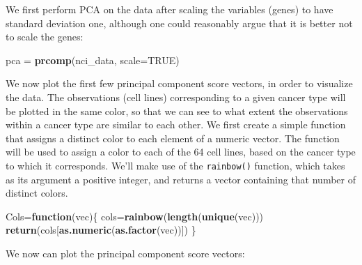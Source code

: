 \documentclass[openany]{book}
\newenvironment{Shaded}{\begin{snugshade}}{\end{snugshade}}
\newcommand{\ControlFlowTok}[1]{\textcolor[rgb]{0.13,0.29,0.53}{\textbf{#1}}}
\newcommand{\DataTypeTok}[1]{\textcolor[rgb]{0.13,0.29,0.53}{#1}}
\newcommand{\DecValTok}[1]{\textcolor[rgb]{0.00,0.00,0.81}{#1}}
\newcommand{\KeywordTok}[1]{\textcolor[rgb]{0.13,0.29,0.53}{\textbf{#1}}}
\newcommand{\NormalTok}[1]{#1}
\newcommand{\OperatorTok}[1]{\textcolor[rgb]{0.81,0.36,0.00}{\textbf{#1}}}
\newcommand{\OtherTok}[1]{\textcolor[rgb]{0.56,0.35,0.01}{#1}}
\newcommand{\StringTok}[1]{\textcolor[rgb]{0.31,0.60,0.02}{#1}}
\begin{document}
We first perform PCA on the data after scaling the variables (genes) to
have standard deviation one, although one could reasonably argue that it
is better not to scale the genes:

\begin{Shaded}
\begin{Highlighting}[]
\NormalTok{pca =}\StringTok{ }\KeywordTok{prcomp}\NormalTok{(nci_data, }\DataTypeTok{scale=}\OtherTok{TRUE}\NormalTok{)}
\end{Highlighting}
\end{Shaded}

We now plot the first few principal component score vectors, in order to
visualize the data. The observations (cell lines) corresponding to a given
cancer type will be plotted in the same color, so that we can see to what
extent the observations within a cancer type are similar to each other. We
first create a simple function that assigns a distinct color to each element
of a numeric vector. The function will be used to assign a color to each of
the 64 cell lines, based on the cancer type to which it corresponds.
We'll make use of the \texttt{rainbow()} function, which takes as its argument a positive integer,
and returns a vector containing that number of distinct colors.

\begin{Shaded}
\begin{Highlighting}[]
\NormalTok{Cols=}\ControlFlowTok{function}\NormalTok{(vec)\{}
\NormalTok{    cols=}\KeywordTok{rainbow}\NormalTok{(}\KeywordTok{length}\NormalTok{(}\KeywordTok{unique}\NormalTok{(vec)))}
    \KeywordTok{return}\NormalTok{(cols[}\KeywordTok{as.numeric}\NormalTok{(}\KeywordTok{as.factor}\NormalTok{(vec))])}
\NormalTok{  \}}
\end{Highlighting}
\end{Shaded}

We now can plot the principal component score vectors:

\begin{Shaded}
\end{Shaded}
\end{document}
